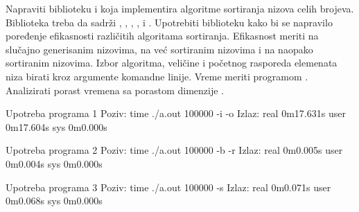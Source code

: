 \begin{Answer}[ref=506]
\end{Answer}
\begin{Exercise}[label=507]
  Napraviti biblioteku  i  koja
  implementira algoritme sortiranja nizova celih brojeva. Biblioteka
  treba da sadrži , , ,
  ,  i . Upotrebiti
  biblioteku kako bi se napravilo poređenje efikasnosti različitih
  algoritama sortiranja. Efikasnost meriti na slučajno generisanim
  nizovima, na već sortiranim nizovima i na naopako sortiranim
  nizovima. Izbor algoritma, veličine i početnog rasporeda elemenata
  niza birati kroz argumente komandne linije.  Vreme meriti programom
  . Analizirati porast vremena sa porastom dimenzije
  .

\begin{miditest}
\begin{test}{Upotreba programa 1}
Poziv: time ./a.out 100000 -i -o
Izlaz:
  real    0m17.631s
  user    0m17.604s
  sys     0m0.000s
\end{test}
\end{miditest}
\begin{miditest}
\begin{test}{Upotreba programa 2}
Poziv: time ./a.out 100000 -b -r
Izlaz:
  real    0m0.005s
  user    0m0.004s
  sys     0m0.000s
\end{test}
\end{miditest}

\begin{miditest}
\begin{test}{Upotreba programa 3}
Poziv: time ./a.out 100000 -s
Izlaz:
  real    0m0.071s
  user    0m0.068s
  sys     0m0.000s
\end{test}
\end{miditest}

\end{Exercise}

